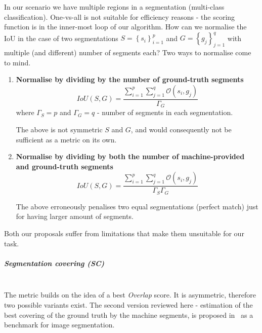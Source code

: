 In our scenario we have multiple regions in a segmentation (multi-class classification). One-vs-all is not suitable for efficiency reasons - the scoring function is in the inner-most loop of our algorithm. How can we normalise the IoU in the case of two segmentations $S=\left\{ {s_{i}}\right\} _{i=1}^{p}$
and $G=\left\{ {g_{j}}\right\} _{j=1}^{q}$ with multiple (and different) number of segments each? Two ways to normalise come to mind.

\begin{enumerate}
\item{\textbf{Normalise by dividing by the number of ground-truth segments}}
\begin{equation}
IoU(S,G)=\frac{\sum\limits _{i=1}^{p}\sum\limits _{j=1}^{q}\mathcal{O}\left(s_{i},g_{j}\right)}{\Gamma_{G}}
\end{equation}
where $\Gamma_{S}=p$ and $\Gamma_{G}=q$ - number of segments in each segmentation.

The above is not symmetric \wrt $S$ and $G$, and would consequently not be sufficient as a metric on its own.

\item{\textbf{Normalise by dividing by both the number of machine-provided and ground-truth segments}}
\begin{equation}
IoU(S,G)=\frac{\sum\limits _{i=1}^{p}\sum\limits _{j=1}^{q}\mathcal{O}\left(s_{i},g_{j}\right)}{\Gamma_{S}\Gamma_{G}}
\end{equation}

The above erroneously penalises two equal segmentations (perfect match) just for having larger amount of segments.
\end{enumerate}
Both our proposals suffer from limitations that make them unsuitable for our task.

\subparagraph{Segmentation covering (SC)}\mbox{}\\
The metric builds on the idea of a best \textit{Overlap} score. 
It is asymmetric, therefore two possible variants exist. The second version reviewed here - estimation of the best covering of the ground truth by the machine segments, is proposed in~\cite{Arbelaez09} as a benchmark for image segmentation.

